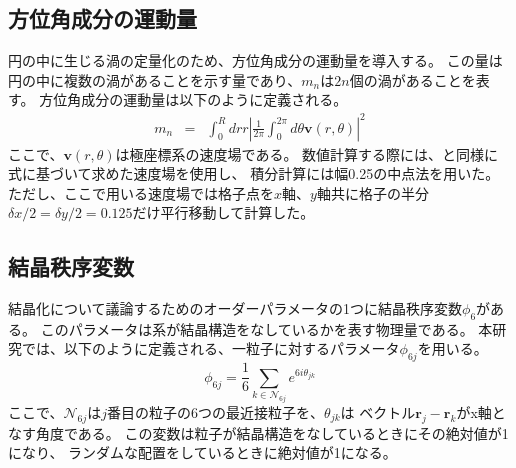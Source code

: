 \documentclass[/Users/ikedahajime/GitHub/reserch/master_report/thesis]{subfiles}
\begin{document}
\subsection{方位角成分の運動量}
円の中に生じる渦の定量化のため、方位角成分の運動量を導入する\cite{nishiguchiVortexReversalPrecursor2024}。
この量は円の中に複数の渦があることを示す量であり、$m_n$は$2n$個の渦があることを表す。
方位角成分の運動量は以下のように定義される。
\begin{eqnarray}
    m_n &=& \int_0^R dr r\left|\frac{1}{2\pi}\int_0^{2\pi}d\theta \bm{v}(r,\theta)\right|^2
\end{eqnarray}
ここで、$\bm{v}(r,\theta)$は極座標系の速度場である。
数値計算する際には、と同様に式に基づいて求めた速度場を使用し、
積分計算には幅0.25の中点法を用いた。
ただし、ここで用いる速度場では格子点を$x$軸、$y$軸共に格子の半分$\delta x/2=\delta y/2=0.125$だけ平行移動して計算した。

\subsection{結晶秩序変数}
結晶化について議論するためのオーダーパラメータの1つに結晶秩序変数$\phi_6$がある。
このパラメータは系が結晶構造をなしているかを表す物理量である。
本研究では、以下のように定義される、一粒子に対するパラメータ$\phi_{6j}$を用いる。
\begin{equation}
    \phi_{6j}=\frac{1}{6}\sum_{k\in \mathcal{N}_{6j}} e^{6i\theta_{jk}}
\end{equation}
ここで、$\mathcal{N}_{6j}$は$j$番目の粒子の6つの最近接粒子を、$\theta_{jk}$は
ベクトル$\bm{r}_j-\bm{r}_k$がx軸となす角度である。
この変数は粒子が結晶構造をなしているときにその絶対値が1になり、
ランダムな配置をしているときに絶対値が1になる。
\end{document}
